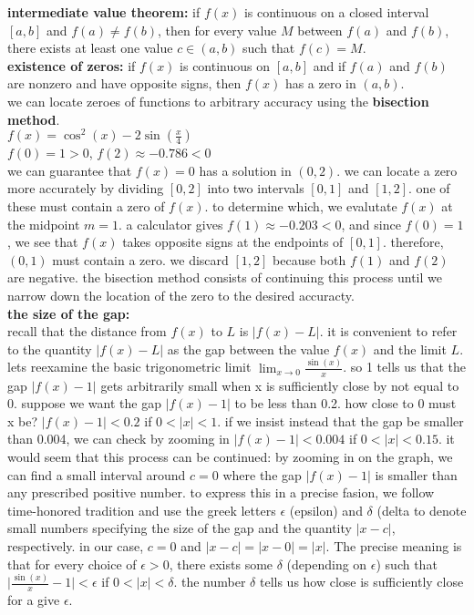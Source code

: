 \documentclass{article}
\begin{document}
\textbf{intermediate value theorem:} if $f(x)$ is continuous on a closed interval $[a, b]$ and $f(a) \neq f(b)$, then for every value $M$ between $f(a)$ and $f(b)$, there exists at least one value $c \in (a, b)$ such that $f(c) = M$.\\

\textbf{existence of zeros:} if $f(x)$ is continuous on $[a, b]$ and if $f(a)$ and $f(b)$ are nonzero and have opposite signs, then $f(x)$ has a zero in $(a, b)$.\\

we can locate zeroes of functions to arbitrary accuracy using the \textbf{bisection method}.\\
$f(x) = \cos^2(x) - 2\sin(\frac{x}{4})$\\
$f(0) = 1 > 0$, $f(2) \approx -0.786 < 0$\\
we can guarantee that $f(x) = 0$ has a solution in $(0, 2)$. we can locate a zero more accurately by dividing $[0, 2]$ into two intervals $[0, 1]$ and $[1, 2]$. one of these must contain a zero of $f(x)$. to determine which, we evalutate $f(x)$ at the midpoint $m = 1$. a calculator gives $f(1) \approx -0.203 < 0$, and since $f(0) = 1$, we see that $f(x)$ takes opposite signs at the endpoints of $[0, 1]$. therefore, $(0, 1)$ must contain a zero. we discard $[1, 2]$ because both $f(1)$ and $f(2)$ are negative. the bisection method consists of continuing this process until we narrow down the location of the zero to the desired accuracty.\\

\textbf{the size of the gap:}\\
recall that the distance from $f(x)$ to $L$ is $\lvert f(x) - L\rvert$. it is convenient to refer to the quantity $\lvert f(x) - L\rvert$ as the gap between the value $f(x)$ and the limit $L$. lets reexamine the basic trigonometric limit $\lim_{x \to 0}\frac{\sin(x)}{x}$. so 1 tells us that the gap $\lvert f(x) - 1\rvert$ gets arbitrarily small when x is sufficiently close by not equal to 0. suppose we want the gap $\lvert f(x) - 1\rvert$ to be less than 0.2. how close to 0 must x be? $\lvert f(x) - 1\rvert < 0.2$ if $0 < \lvert x\rvert < 1$. if we insist instead that the gap be smaller than 0.004, we can check by zooming in $\lvert f(x) - 1\rvert < 0.004$ if $0 < \lvert x\rvert < 0.15$. it would seem that this process can be continued: by zooming in on the graph, we can find a small interval around $c = 0$ where the gap $\lvert f(x) - 1\rvert$ is smaller than any prescribed positive number. to express this in a precise fasion, we follow time-honored tradition and use the greek letters $\epsilon$ (epsilon) and $\delta$ (delta to denote small numbers specifying the size of the gap and the quantity $\lvert x - c\rvert$, respectively. in our case, $c = 0$ and $\lvert x - c\rvert = \lvert x - 0\rvert = \lvert x\rvert$. The precise meaning is that for every choice of $\epsilon > 0$, there exists some $\delta$ (depending on $\epsilon$) such that $\lvert \frac{\sin(x)}{x} - 1\rvert < \epsilon$ if $0 < \lvert x\rvert < \delta$. the number $\delta$ tells us how close is sufficiently close for a give $\epsilon$.\\
\end{document}
